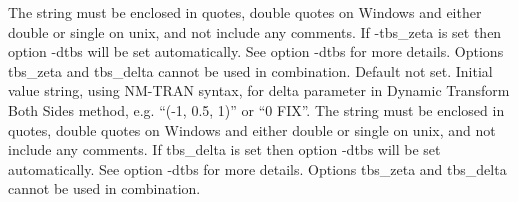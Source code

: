 \begin{optionlist}
The string must be enclosed in quotes, double quotes on Windows and either double or single on unix, and not include any comments.
If -tbs\_zeta is set then option -dtbs will be set automatically. See option -dtbs for more details. Options tbs\_zeta and tbs\_delta cannot be used in combination.  
\nextopt
{}
Default not set. Initial value string, using NM-TRAN syntax, for delta parameter in Dynamic Transform Both Sides method, e.g. ``(-1, 0.5, 1)'' or ``0 FIX''. 
The string must be enclosed in quotes, double quotes on Windows and either double or single on unix, and not include any comments.
If tbs\_delta is set then option -dtbs will be set automatically. See option -dtbs for more details. Options tbs\_zeta and tbs\_delta cannot be used in combination.  
\nextopt
\end{optionlist}
